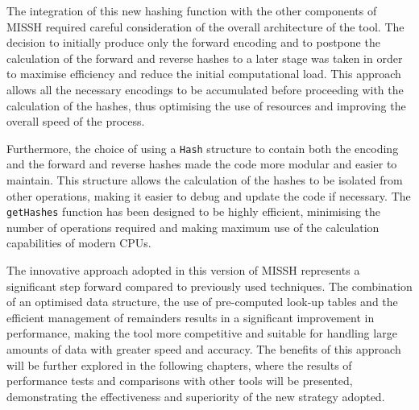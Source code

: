 The integration of this new hashing function with the other components of \acs{MISSH} required careful consideration of the overall architecture of the tool. The decision to initially produce only the forward encoding and to postpone the calculation of the forward and reverse hashes to a later stage was taken in order to maximise efficiency and reduce the initial computational load. This approach allows all the necessary encodings to be accumulated before proceeding with the calculation of the hashes, thus optimising the use of resources and improving the overall speed of the process.

Furthermore, the choice of using a \verb|Hash| structure to contain both the encoding and the forward and reverse hashes made the code more modular and easier to maintain. This structure allows the calculation of the hashes to be isolated from other operations, making it easier to debug and update the code if necessary. The \verb|getHashes| function has been designed to be highly efficient, minimising the number of operations required and making maximum use of the calculation capabilities of modern CPUs.

The innovative approach adopted in this version of \acs{MISSH} represents a significant step forward compared to previously used techniques. The combination of an optimised data structure, the use of pre-computed look-up tables and the efficient management of remainders results in a significant improvement in performance, making the tool more competitive and suitable for handling large amounts of data with greater speed and accuracy. The benefits of this approach will be further explored in the following chapters, where the results of performance tests and comparisons with other tools will be presented, demonstrating the effectiveness and superiority of the new strategy adopted.
